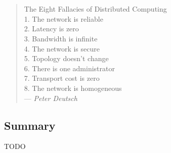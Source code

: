 \chapter*{}
\begin{quote}
The Eight Fallacies of Distributed Computing\\
 1. The network is reliable\\
 2. Latency is zero\\
 3. Bandwidth is infinite\\
 4. The network is secure\\
 5. Topology doesn't change\\
 6. There is one administrator\\
 7. Transport cost is zero\\
 8. The network is homogeneous\\
--- \emph{Peter Deutsch}
\end{quote}

\section*{Summary}
TODO
